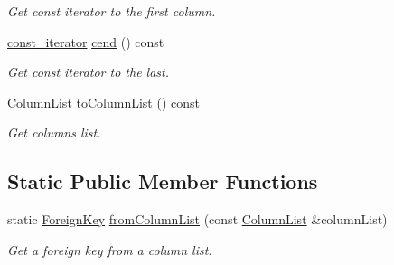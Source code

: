 \begin{DoxyCompactItemize}
\begin{DoxyCompactList}\small\item\em Get const iterator to the first column. \end{DoxyCompactList}\item 
\hyperlink{class_mdt_1_1_item_model_1_1_foreign_key_a3cdc4141d54d7a7df5766c6b0c3fcf57}{const\+\_\+iterator} \hyperlink{class_mdt_1_1_item_model_1_1_foreign_key_a99bd224475b557257d00002c589cc6b2}{cend} () const \hypertarget{class_mdt_1_1_item_model_1_1_foreign_key_a99bd224475b557257d00002c589cc6b2}{}\label{class_mdt_1_1_item_model_1_1_foreign_key_a99bd224475b557257d00002c589cc6b2}

\begin{DoxyCompactList}\small\item\em Get const iterator to the last. \end{DoxyCompactList}\item 
\hyperlink{class_mdt_1_1_item_model_1_1_column_list}{Column\+List} \hyperlink{class_mdt_1_1_item_model_1_1_foreign_key_a2ddab3f5a6b99ecb9eb75b7b28249cda}{to\+Column\+List} () const \hypertarget{class_mdt_1_1_item_model_1_1_foreign_key_a2ddab3f5a6b99ecb9eb75b7b28249cda}{}\label{class_mdt_1_1_item_model_1_1_foreign_key_a2ddab3f5a6b99ecb9eb75b7b28249cda}

\begin{DoxyCompactList}\small\item\em Get columns list. \end{DoxyCompactList}\end{DoxyCompactItemize}
\subsection*{Static Public Member Functions}
\begin{DoxyCompactItemize}
\item 
static \hyperlink{class_mdt_1_1_item_model_1_1_foreign_key}{Foreign\+Key} \hyperlink{class_mdt_1_1_item_model_1_1_foreign_key_a2b8b6ba210aa624d8a5d4e21cca1c157}{from\+Column\+List} (const \hyperlink{class_mdt_1_1_item_model_1_1_column_list}{Column\+List} \&column\+List)\hypertarget{class_mdt_1_1_item_model_1_1_foreign_key_a2b8b6ba210aa624d8a5d4e21cca1c157}{}\label{class_mdt_1_1_item_model_1_1_foreign_key_a2b8b6ba210aa624d8a5d4e21cca1c157}

\begin{DoxyCompactList}\small\item\em Get a foreign key from a column list. \end{DoxyCompactList}\end{DoxyCompactItemize}


